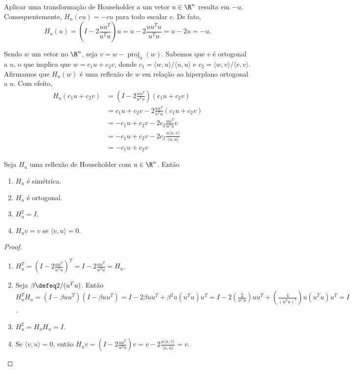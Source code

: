 \documentclass{article}
\DeclareMathOperator{\proj}{proj}
\begin{document}
Aplicar uma transformação de Householder a um vetor \(u \in \R^n\) resulta em \(-u\). Consequentemente, \(H_u(cu) = -cu\) para todo escalar \(c\). De fato,
\[
    H_u(u) = \left(I - 2\frac{uu^T}{u^Tu}\right)u = u - 2\frac{uu^Tu}{u^Tu} = u - 2u = -u.
\]

Sendo \(w\) um vetor no \(\R^n\), seja \(v = w - \proj_u(w)\). Sabemos que \(v\) é ortogonal a \(u\), o que implica que \(w = c_1 u + c_2 v\), donde \(c_1 = \langle w, u \rangle / \langle u, u \rangle\) e \(c_2 = \langle w, v \rangle / \langle v, v \rangle\). Afirmamos que \(H_u(w)\) é uma reflexão de \(w\) em relação ao hiperplano ortogonal a \(u\). Com efeito,
\begin{align*}
    H_u(c_1 u + c_2 v) &= \left(I - 2\frac{uu^T}{u^Tu}\right)(c_1 u + c_2 v) \\
    &= c_1 u + c_2 v - 2\frac{uu^T}{u^Tu}(c_1 u + c_2 v) \\
    &= -c_1 u + c_2 v - 2c_2 \frac{uu^T}{u^Tu}v \\
    &= -c_1 u + c_2 v - 2c_2 \frac{u \langle u, v \rangle}{\langle u, u \rangle} \\
    &= -c_1 u + c_2 v
\end{align*}

\begin{prop}
    Seja \(H_u\) uma reflexão de Householder com \(u \in \R^n\). Então
    \begin{enumerate}
        \item \(H_u\) é simétrica.
        \item \(H_u\) é ortogonal.
        \item \(H_u^2 = I\).
        \item \(H_u v = v\) se \(\langle v, u \rangle = 0\).
    \end{enumerate}
\end{prop}

\begin{proof}
    \begin{enumerate}
        \item \(\displaystyle H_u^T = \left(I - 2\frac{uu^T}{u^Tu}\right)^T = I - 2\frac{uu^T}{u^Tu} = H_u\).
        \item Seja \(\beta \defeq 2/(u^Tu)\). Então \(\displaystyle H_u^T H_u = (I - \beta uu^T)(I - \beta uu^T) = I - 2\beta uu^T + \beta^2 u(u^Tu)u^T = I - 2\left(\frac{2}{u^Tu}\right) uu^T + \left(\frac{4}{(u^Tu)^2}\right) u(u^Tu)u^T = I\).
        \item \(H_u^2 = H_u H_u = I\).
        \item Se \(\langle v, u \rangle = 0\), então \(\displaystyle H_u v = \left(I - 2\frac{uu^T}{u^Tu}\right)v = v - 2\frac{u \langle u, v \rangle}{\langle u, u \rangle} = v\).
    \end{enumerate}
\end{proof}
\end{document}

